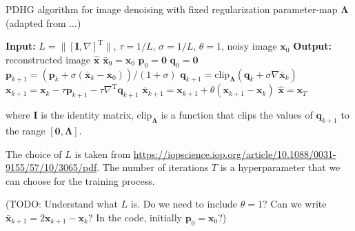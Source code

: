 \documentclass[12pt]{article}
\begin{document}
\begin{algorithm}[H]
\caption{PDHG algorithm for image denoising with fixed regularization parameter-map $\boldsymbol{\Lambda}$ (adapted from ...)}
\begin{algorithmic}[1]
\STATE \textbf{Input:} $L = \| [\mathbf{I}, \nabla]^\text{T} \|$, $\tau = 1/L$, $\sigma = 1/L$, $\theta = 1$, noisy image $\mathbf{x}_0$
\STATE \textbf{Output:} reconstructed image $\hat{\mathbf{x}}$
\STATE $\bar{\mathbf{x}}_0 = \mathbf{x}_0$
\STATE $\mathbf{p}_0 = \mathbf{0}$
\STATE $\mathbf{q}_0 = \mathbf{0}$
    \STATE $\mathbf{p}_{k+1} = \left(\mathbf{p}_k + \sigma ( \bar{\mathbf{x}}_k - \mathbf{x}_0)\right) / (1 + \sigma)$
    \STATE $\mathbf{q}_{k+1} = \text{clip}_{\boldsymbol{\Lambda}} \left(\mathbf{q}_k + \sigma \nabla \bar{\mathbf{x}}_k \right)$
    \STATE $\mathbf{x}_{k+1} = \mathbf{x}_k - \tau \mathbf{p}_{k+1} - \tau \nabla^\text{T} \mathbf{q}_{k+1}$
    \STATE $\bar{\mathbf{x}}_{k+1} = \mathbf{x}_{k+1} + \theta (\mathbf{x}_{k+1} - \mathbf{x}_k)$
\ENDFOR
\STATE $\hat{\mathbf{x}} = \mathbf{x}_T$
\end{algorithmic}
\end{algorithm}

where $\mathbf{I}$ is the identity matrix, $\text{clip}_{\boldsymbol{\Lambda}}$ is a function that clips the values of $\mathbf{q}_{k+1}$ to the range $[\mathbf{0}, \boldsymbol{\Lambda}]$.

The choice of $L$ is taken from \cite{Sidky_2012} \url{https://iopscience.iop.org/article/10.1088/0031-9155/57/10/3065/pdf}. 
The number of iterations $T$ is a hyperparameter that we can choose for the training process.

(TODO: Understand what $L$ is. Do we need to include $\theta = 1$? Can we write $\bar{\mathbf{x}}_{k+1} = 2 \mathbf{x}_{k+1} - \mathbf{x}_k$? In the code, initially $\mathbf{p}_0 = \mathbf{x}_0$?)




\end{document}
